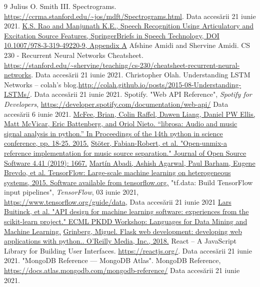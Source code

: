 \begin{thebibliography}{9}
    Julius O. Smith III. Spectrograms. \url{https://ccrma.stanford.edu/~jos/mdft/Spectrograms.html}. Data accesării 21 iunie 2021.
    \href{https://link.springer.com/content/pdf/bbm%3A978-3-319-49220-9%2F1.pdf}{K.S. Rao and Manjunath K.E., Speech Recognition Using Articulatory
    and Excitation Source Features, SpringerBriefs in Speech Technology,
    DOI 10.1007/978-3-319-49220-9, Appendix A}
    Afshine Amidi and Shervine Amidi. CS 230 - Recurrent Neural Networks Cheatsheet. \url{https://stanford.edu/~shervine/teaching/cs-230/cheatsheet-recurrent-neural-networks}. Data accesării 21 iunie 2021.
    Christopher Olah. Understanding LSTM Networks -- colah’s blog.\url{http://colah.github.io/posts/2015-08-Understanding-LSTMs/}. Data accesării 21 iunie 2021.
    Spotify. "Web API Reference", \textit{Spotify for Developers}, \url{https://developer.spotify.com/documentation/web-api/} Data accesării 6 iunie 2021.
    \href{http://conference.scipy.org/proceedings/scipy2015/pdfs/brian_mcfee.pdf}{McFee, Brian, Colin Raffel, Dawen Liang, Daniel PW Ellis, Matt McVicar, Eric Battenberg, and Oriol Nieto. “librosa: Audio and music signal analysis in python.” In Proceedings of the 14th python in science conference, pp. 18-25. 2015.}
    \href{https://sigsep.github.io/open-unmix/#paper}{Stöter, Fabian-Robert, et al. "Open-unmix-a reference implementation for music source separation." Journal of Open Source Software 4.41 (2019): 1667.}
    \href{https://www.tensorflow.org/}{Martín Abadi, Ashish Agarwal, Paul Barham, Eugene Brevdo, et al.
TensorFlow: Large-scale machine learning on heterogeneous systems,
2015. Software available from tensorflow.org.}
    "tf.data: Build TensorFlow input pipelines", \textit{TensorFlow}, 03 iunie 2021, \url{https://www.tensorflow.org/guide/data}, Data accesării 21 iunie 2021
    \href{https://scikit-learn.org/stable/modules/classes.html}{Lars Buitinck, et al. "API design for machine learning software: experiences from the scikit-learn project." ECML PKDD Workshop: Languages for Data Mining and Machine Learning.}
    \href{https://flask.palletsprojects.com/en/2.0.x/}{Grinberg, Miguel. Flask web development: developing web applications with python.. O'Reilly Media, Inc., 2018.}
    React – A JavaScript Library for Building User Interfaces. \url{https://reactjs.org/}. Data accesării 21 iunie 2021.
    "MongoDB Reference — MongoDB Atlas". MongoDB Reference, \url{https://docs.atlas.mongodb.com/mongodb-reference/} Data accesării 21 iunie 2021.
    \end{thebibliography}